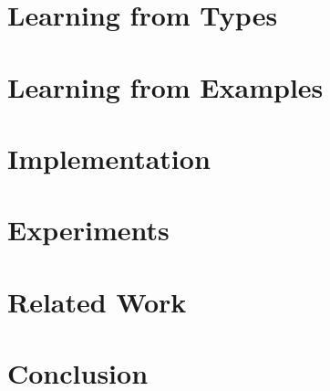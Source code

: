 \documentclass[acmsmall]{acmart}
\begin{document}


\section{Learning from Types}
\section{Learning from Examples}

\section{Implementation}

\section{Experiments}
\section{Related Work}
\section{Conclusion}








\end{document}
